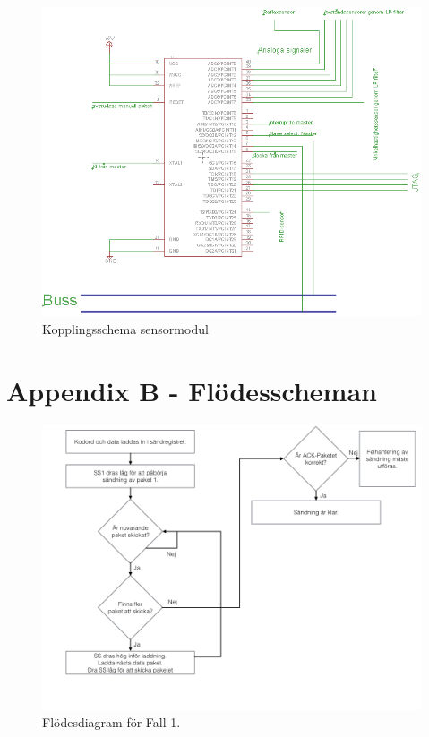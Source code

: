 \documentclass[a4paper,12pt,fleqn]{article}
\begin{document}
\begin{figure}[ht] %
  \begin{center}
  \includegraphics[keepaspectratio=true,width=\linewidth]{bilder/sensormodulkoppling.png}  %
  \end{center}
  \caption{Kopplingsschema sensormodul} %
  \label{fig:kopplingsensor} %
\end{figure}
 \clearpage %
 

\newpage
\section*{Appendix B - Flödesscheman}

\begin{figure}[htp] %
  \begin{center}
  \includegraphics[keepaspectratio=true,width=\linewidth]{bilder/SPIbild002.jpg}  %
  \end{center}
  \caption{Flödesdiagram för Fall 1.} %
  \label{fig:case1flow}
\end{figure}
\end{document}
